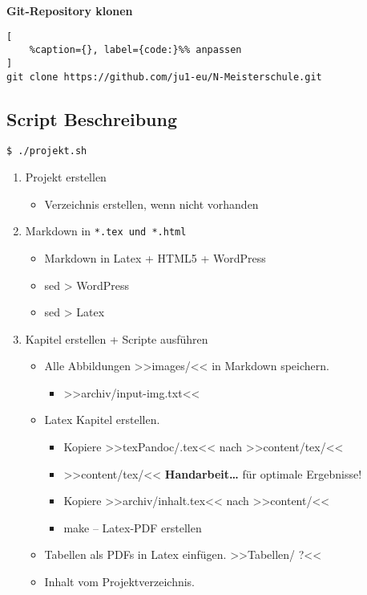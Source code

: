 \textbf{Git-Repository klonen}

\lstset{language=Python}%
\begin{lstlisting}[
	%caption={}, label={code:}%% anpassen
]
git clone https://github.com/ju1-eu/N-Meisterschule.git
\end{lstlisting}

\subsection{Script Beschreibung}\label{script-beschreibung}

\verb|$ ./projekt.sh|

\begin{enumerate}
\item
  Projekt erstellen

  \begin{itemize}
  \item
    Verzeichnis erstellen, wenn nicht vorhanden
  \end{itemize}
\item
  Markdown in \verb|*.tex und *.html|

  \begin{itemize}
  \item
    Markdown in Latex + HTML5 + WordPress
  \item
    sed > WordPress
  \item
    sed > Latex
  \end{itemize}
\item
  Kapitel erstellen + Scripte ausführen

  \begin{itemize}
  \item
    Alle Abbildungen >>images/<< in Markdown speichern.

    \begin{itemize}
    \item
      >>archiv/input-img.txt<<
    \end{itemize}
  \item
    Latex Kapitel erstellen.

    \begin{itemize}
    \item
      Kopiere >>texPandoc/.tex<< nach >>content/tex/<<
    \item
      >>content/tex/<< \textbf{Handarbeit\ldots{}} für optimale
      Ergebnisse!
    \item
      Kopiere >>archiv/inhalt.tex<< nach >>content/<<
    \item
      make -- Latex-PDF erstellen
    \end{itemize}
  \item
    Tabellen als PDFs in Latex einfügen. >>Tabellen/ ?<<
  \item
    Inhalt vom Projektverzeichnis.


\end{itemize}
\end{enumerate}
